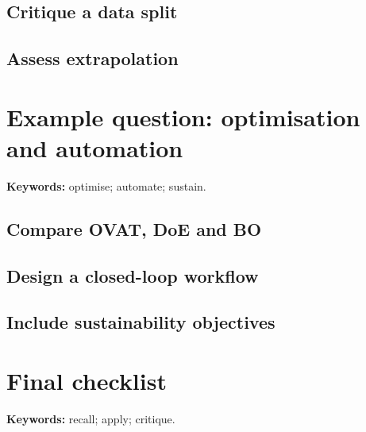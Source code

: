 
\subsection{Critique a data split}


\subsection{Assess extrapolation}


\section{Example question: optimisation and automation}

\begin{resultbox}
\textbf{Keywords:} optimise; automate; sustain.
\end{resultbox}

\subsection{Compare OVAT, DoE and BO}


\subsection{Design a closed-loop workflow}


\subsection{Include sustainability objectives}


\section{Final checklist}

\begin{notebox}
\textbf{Keywords:} recall; apply; critique.
\end{notebox}

